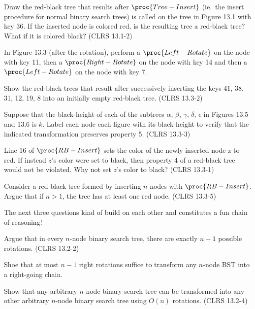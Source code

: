 \documentclass{article}
\begin{document}
\thispagestyle{fancy}

\begin{Exercise}[title={Simple training exercises}]

    \Question
    Draw the red-black tree that results after $\proc{Tree-Insert}$ (ie.\ the
    insert procedure for normal binary search trees) is called on the tree in
    Figure 13.1 with key 36. If the inserted node is colored red, is the
    resulting tree a red-black tree? What if it is colored black? (CLRS 13.1-2)

    \Question
    In Figure 13.3 (after the rotation), perform a $\proc{Left-Rotate}$ on the
    node with key 11, then a $\proc{Right-Rotate}$ on the node with key 14 and
    then a $\proc{Left-Rotate}$ on the node with key 7.

    \Question
    Show the red-black trees that result after successively inserting the keys
    41, 38, 31, 12, 19, 8 into an initially empty red-black tree. (CLRS 13.3-2)

    \Question
    Suppose that the black-height of each of the subtrees $\alpha$, $\beta$,
    $\gamma$, $\delta$, $\epsilon$ in Figures 13.5 and 13.6 is $k$. Label each
    node each figure with its black-height to verify that the indicated
    transformation preserves property 5. (CLRS 13.3-3)
\end{Exercise}

\begin{Exercise}[title={Fun creative exercises!}]
    \Question
    Line 16 of $\proc{RB-Insert}$ sets the color of the newly inserted node z to
    red. If instead $z$'s color were set to black, then property 4 of a
    red-black tree would not be violated. Why not set $z$'s color to black?
    (CLRS 13.3-1)

    \Question
    Consider a red-black tree formed by inserting $n$ nodes with
    $\proc{RB-Insert}$. Argue that if $n > 1$, the tree has at least one red
    node. (CLRS 13.3-5)

    \bigskip
    \ExeText
    \noindent
    The next three questions kind of build on each other and constitutes a fun
    chain of reasoning!

    \Question
    Argue that in every $n$-node binary search tree, there are exactly $n - 1$
    possible rotations. (CLRS 13.2-2)

    \Question
    Shoe that at most $n - 1$ right rotations suffice to transform any $n$-node
    BST into a right-going chain.

    \Question
    Show that any arbitrary $n$-node binary search tree can be transformed into
    any other arbitrary $n$-node binary search tree using $O(n)$ rotations.
    (CLRS 13.2-4)


\end{Exercise}
\end{document}

